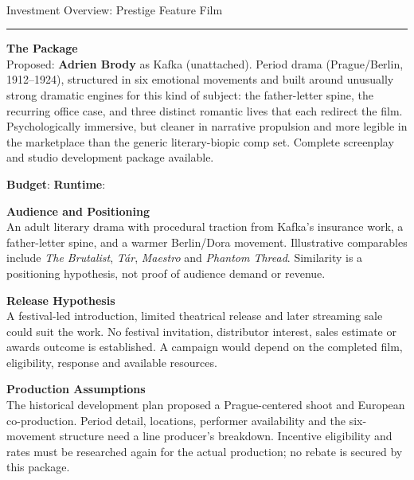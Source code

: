 \documentclass[11pt,letterpaper]{article}
\begin{document}
\begin{center}
{\Large\bfseries\sffamily \filmtitleupper}\\[3pt]
{\normalsize\sffamily\color{kafkagray} Investment Overview: Prestige Feature Film}
\end{center}
\vspace{2pt}
\textcolor{sectionrule}{\rule{\textwidth}{0.5pt}}
\vspace{4pt}

\textbf{The Package}\\
Proposed: \textbf{Adrien Brody} as Kafka (unattached). Period drama (Prague/Berlin, 1912--1924), structured in six emotional movements and built around unusually strong dramatic engines for this kind of subject: the father-letter spine, the recurring office case, and three distinct romantic lives that each redirect the film. Psychologically immersive, but cleaner in narrative propulsion and more legible in the marketplace than the generic literary-biopic comp set. Complete screenplay and studio development package available.

\vspace{2pt}

\textbf{Budget}: \filmbudgetrange \hfill \textbf{Runtime}: \filmruntime

\vspace{2pt}

\textbf{Audience and Positioning}\\
An adult literary drama with procedural traction from Kafka's insurance work, a father-letter spine, and a warmer Berlin/Dora movement. Illustrative comparables include \textit{The Brutalist}, \textit{Tár}, \textit{Maestro} and \textit{Phantom Thread}. Similarity is a positioning hypothesis, not proof of audience demand or revenue.

\vspace{2pt}
\textbf{Release Hypothesis}\\
A festival-led introduction, limited theatrical release and later streaming sale could suit the work. No festival invitation, distributor interest, sales estimate or awards outcome is established. A campaign would depend on the completed film, eligibility, response and available resources.

\vspace{2pt}
\textbf{Production Assumptions}\\
The historical development plan proposed a Prague-centered shoot and European co-production. Period detail, locations, performer availability and the six-movement structure need a line producer's breakdown. Incentive eligibility and rates must be researched again for the actual production; no rebate is secured by this package.
\end{document}
